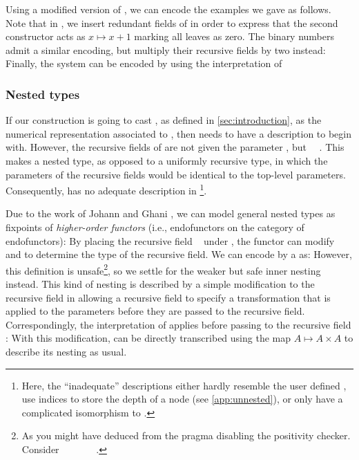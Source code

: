 Using a modified version of , we can encode the examples we gave as follows. Note that in \bN{}, we insert redundant fields of  in order to express that the second constructor acts as $x \mapsto x + 1$
marking all leaves as zero. The binary numbers admit a similar encoding, but multiply their recursive fields by two instead:
Finally, the  system can be encoded by using the interpretation of 


\subsubsection{Nested types}
If our construction is going to cast , as defined in \autoref{sec:introduction}, as the numerical representation associated to , then  needs to have a description to begin with. However, the recursive fields of  are not given the parameter , but \ \ . This makes  a nested type, as opposed to a uniformly recursive type, in which the parameters of the recursive fields would be identical to the top-level parameters. Consequently,  has no adequate description in \footnote{Here, the ``inadequate'' descriptions either hardly resemble the user defined , use indices to store the depth of a node (see \autoref{app:unnested}), or only have a complicated isomorphism to .}. 

Due to the work of Johann and Ghani \cite{initenough}, we can model general nested types as fixpoints of \emph{higher-order functors} (i.e., endofunctors on the category of endofunctors):
By placing the recursive field \  under , the functor  can modify \  and  to determine the type of the recursive field. We can encode  by a  as:
However, this definition is unsafe\footnote{As you might have deduced from the pragma disabling the positivity checker. Consider \ \ \ \AV{=}\ \ \ \ .}, so we settle for the weaker but safe inner nesting instead. This kind of nesting is described by a simple modification to the recursive field  in 
allowing a recursive field to specify a transformation  that is applied to the parameters before they are passed to the recursive field. Correspondingly, the interpretation of  applies  before passing  to the recursive field :
With this modification,  can be directly transcribed 
using the map $A \mapsto A \times A$ to describe its nesting as usual.

